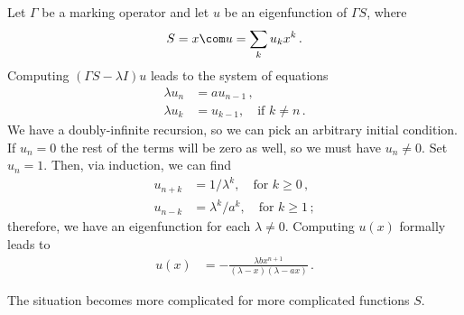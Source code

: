 \begin{example}
Let $\Gamma$ be a marking operator and let $u$ be an eigenfunction of $\Gamma S$, where 
\begin{align}
	S = x\com u = \sum_k u_k x^k\,.
\end{align}
Computing $(\Gamma S-\lambda I)u$ leads to the system of equations
\begin{align}
	\lambda u_n &= a u_{n-1}\,,\\
	\lambda u_k &= u_{k-1}, \quad \text{if } k \neq n\,.
\end{align}
We have a doubly-infinite recursion, so we can pick an arbitrary initial condition. If $u_n = 0$ the rest of the terms will be zero as well, so we must have $u_n \neq 0$. Set $u_n = 1$. Then, via induction, we can find
\begin{align}
	u_{n+k} &= 1/\lambda^{k}, \quad \text{for $k \ge 0$}\,,\\
	u_{n-k} &= \lambda^{k}/a^k, \quad \text{for $k \ge 1$}\,;
\end{align}
therefore, we have an eigenfunction for each $\lambda \neq 0$. Computing $u(x)$ formally leads to
\begin{align}
	u(x) &=-\frac{\lambda b x^{n+1}}{(\lambda-x)(\lambda-ax)}\,.
\end{align}
\end{example}
The situation becomes more complicated for more complicated functions $S$.
